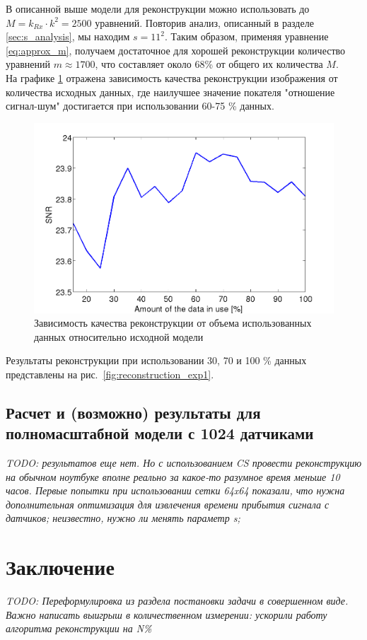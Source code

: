 \documentclass[14pt]{matmex-diploma}
\begin{document}
В описанной выше модели для реконструкции можно использовать до $M = k_{Rx} \cdot k^2 = 2500$ уравнений. Повторив анализ, описанный в разделе \ref{sec:s_analysis}, мы находим $s=11^2$. 
Таким образом, применяя уравнение \eqref{eq:approx_m}, получаем достаточное для хорошей реконструкции количество уравнений $m \approx 1700$, что составляет около 68\% от общего их количества $M$. \\
На графике \ref{fig:used_equations} отражена зависимость качества реконструкции изображения от количества исходных данных, где наилучшее значение покателя "отношение сигнал-шум" достигается при использовании 60-75 \% данных. 

\begin{figure}[h]
\centering
    \includegraphics[width=.7\textwidth]{pics/kwave_snr.png}
    \caption{Зависимость качества реконструкции от объема использованных данных относительно исходной модели}
    \label{fig:used_equations}
\end{figure}

Результаты реконструкции при использовании 30, 70 и 100 \% данных представлены на рис.~\ref{fig:reconstruction_exp1}.




\subsection{Расчет и (возможно) результаты для полномасштабной модели с 1024 датчиками}
\textit{TODO: результатов еще нет. Но с использованием CS провести реконструкцию на обычном ноутбуке вполне реально за какое-то разумное время меньше 10 часов. Первые попытки при использовании сетки 64x64 показали, что нужна дополнительная оптимизация для извлечения времени прибытия сигнала с датчиков; неизвестно, нужно ли менять параметр s; }\\

\section{Заключение} \label{sec:concluding}
\textit{TODO: Переформулировка из раздела постановки задачи в совершенном виде. Важно написать выигрыш в количественном измерении: ускорили работу алгоритма реконструкции на N\%} \\
\\
\\
\end{document}

